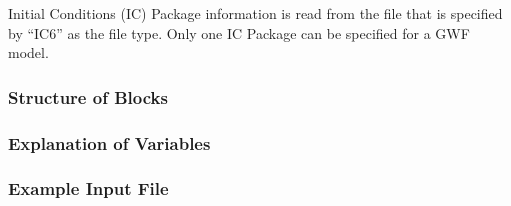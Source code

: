 Initial Conditions (IC) Package information is read from the file that is specified by ``IC6'' as the file type.  Only one IC Package can be specified for a GWF model. 

\vspace{5mm}
\subsubsection{Structure of Blocks}
%


\vspace{5mm}
\subsubsection{Explanation of Variables}
\begin{description}

\end{description}

\vspace{5mm}
\subsubsection{Example Input File}


